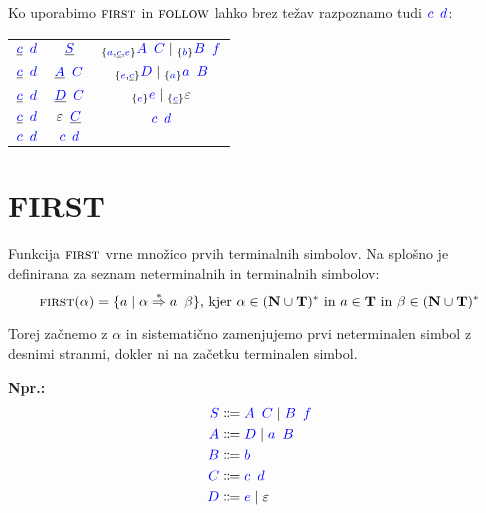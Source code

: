 \documentclass{article}
\newcommand{\Ex}{\textbf{Npr.:}\ }
\newcommand{\FIRST}{\textsc{first}}
\newcommand{\FOLLOW}{\textsc{follow}}
\newcommand{\Set}[1]{\mathbf{#1}}
\newcommand{\Symbol}[1]{\textcolor{blue}{#1}}
\newcommand{\Terminals}{\Set{T}}
\newcommand{\NonTerminals}{\Set{N}}
\newcommand{\Null}{\varepsilon}
\newcommand{\Arrow}{\Coloneq}
\newcommand{\DeriveStar}{\overset{\ast}{\Rightarrow}}
\newcommand{\Seq}{{\ \,}}
\newcommand{\Union}{\mathrel{|}}
\newcommand{\Kleene}[1]{#1^\ast}
\newcommand{\Lookahead}[1]{{}_{\{{#1}\}}}
\begin{document}
Ko uporabimo $\FIRST$ in $\FOLLOW$ lahko brez težav razpoznamo tudi $\Symbol{c} \Seq \Symbol{d}$:
\begin{center}
\begin{tabular}{|c|c|c|}
  \hline
  $\underline{\Symbol{c}} \Seq \Symbol{d}$ & $\underline{\Symbol{S}}$ & $\Lookahead{\Symbol{a}, \underline{\Symbol{c}}, \Symbol{e}} \Symbol{A} \Seq \Symbol{C} \Union \Lookahead{\Symbol{b}} \Symbol{B} \Seq \Symbol{f}$ \\ 
  $\underline{\Symbol{c}} \Seq \Symbol{d}$ & $\underline{\Symbol{A}} \Seq \Symbol{C}$ & $\Lookahead{\Symbol{e}, \underline{\Symbol{c}}} \Symbol{D} \Union \Lookahead{\Symbol{a}} \Symbol{a} \Seq \Symbol{B}$ \\ 
  $\underline{\Symbol{c}} \Seq \Symbol{d}$ & $\underline{\Symbol{D}} \Seq \Symbol{C}$ & $\Lookahead{\Symbol{e}} \Symbol{e} \Union \Lookahead{\underline{\Symbol{c}}} \Null$ \\ 
  $\underline{\Symbol{c}} \Seq \Symbol{d}$ & $\Null \Seq \underline{\Symbol{C}}$ & $\Symbol{c} \Seq \Symbol{d}$ \\ 
  \hline
  $\Symbol{c} \Seq \Symbol{d}$ & $\Symbol{c} \Seq \Symbol{d}$ & \\ 
  \hline
\end{tabular}
\end{center}

\section{FIRST}

Funkcija $\FIRST$ vrne množico prvih terminalnih simbolov.
Na splošno je definirana za seznam neterminalnih in terminalnih simbolov:
\begin{equation*}
  \FIRST(\alpha) = \{ a \mid \alpha \DeriveStar a \Seq \beta \} \text{, kjer } \alpha \in \Kleene{(\NonTerminals \cup \Terminals)} \text{ in } a \in \Terminals \text{ in } \beta \in \Kleene{(\NonTerminals \cup \Terminals)}
\end{equation*}

Torej začnemo z $\alpha$ in sistematično zamenjujemo prvi neterminalen simbol z desnimi stranmi, dokler ni na začetku terminalen simbol.

\Ex
\begin{equation*}
  \begin{aligned}
    \Symbol{S} &\Arrow \Symbol{A} \Seq \Symbol{C} \Union \Symbol{B} \Seq \Symbol{f} \\
    \Symbol{A} &\Arrow \Symbol{D} \Union \Symbol{a} \Seq \Symbol{B} \\
    \Symbol{B} &\Arrow \Symbol{b}\\
    \Symbol{C} &\Arrow \Symbol{c} \Seq \Symbol{d}\\
    \Symbol{D} &\Arrow \Symbol{e} \Union \Null
  \end{aligned}
\end{equation*}
\end{document}
